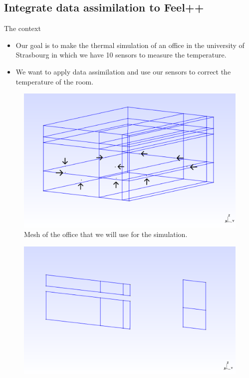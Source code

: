 \subsection{Integrate data assimilation to Feel++}
\begin{frame}[allowframebreaks]{The context}
\begin{itemize}
    \item Our goal is to make the thermal simulation of an office in the university of Strasbourg in which we have 10 sensors to measure the temperature.\\
    \item We want to apply data assimilation and use our sensors to correct the temperature of the room.
\end{itemize}

\begin{minipage}{0.48\linewidth}
    \begin{figure}
        \centering
        \includegraphics[width=\linewidth]{"images/enkf/Maillage_1.png"}
        \caption{Mesh of the office that we will use for the simulation.}
    \end{figure}
\end{minipage} \;
\begin{minipage}{0.48\linewidth}
    \begin{figure}
        \centering
        \includegraphics[width=\linewidth]{"images/enkf/Maillage_2.png"}

\end{figure}
\end{minipage}
\end{frame}
